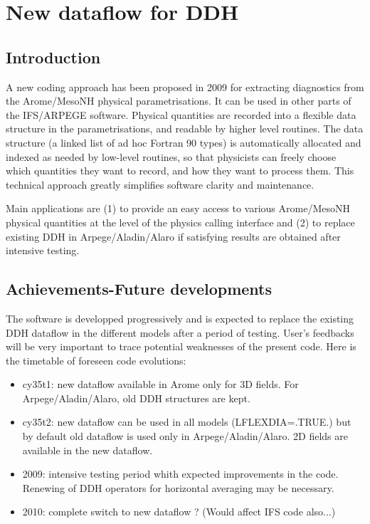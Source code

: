 \section{New dataflow for DDH}

\subsection{Introduction}
A new coding approach has been proposed in 2009 for extracting diagnostics
from the Arome/MesoNH physical parametrisations. It can be used in other parts of
the IFS/ARPEGE software. Physical quantities are recorded into a flexible data structure in the parametrisations, and readable by
higher level routines. The data structure (a linked list of ad hoc Fortran 90 types) is automatically 
allocated and indexed as needed by low-level routines, so that physicists can freely choose 
which quantities they want to record, and how they want to process them. This technical approach 
greatly simplifies software clarity and maintenance. 

Main applications are (1) to provide an
easy access to various Arome/MesoNH physical quantities at the level of the physics calling 
interface and (2) to replace existing DDH in Arpege/Aladin/Alaro if satisfying results are
obtained after intensive testing.


\subsection{Achievements-Future developments}
The software is developped progressively and is expected to replace the existing DDH dataflow 
in the different models after a period of testing. User's feedbacks will be very important to 
trace potential weaknesses of the present code.
Here is the timetable of foreseen code evolutions:
\begin{itemize}
\item cy35t1: new dataflow available in Arome only for 3D fields. For Arpege/Aladin/Alaro, old DDH structures are kept.
\item cy35t2: new dataflow can be used in all models (LFLEXDIA=.TRUE.) but by default old dataflow is used only in Arpege/Aladin/Alaro.
2D fields are available in the new dataflow. 
\item 2009: intensive testing period whith expected improvements in the code. Renewing of DDH operators for horizontal averaging may be necessary.
\item 2010: complete switch to new dataflow ? (Would affect IFS code also...)
\end{itemize}




